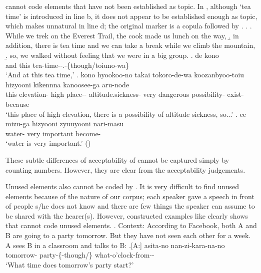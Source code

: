  cannot code elements that have not been established as topic.
In \Next,
although `tea time' is introduced in line b,
it does not appear to be established enough as topic,
which makes  unnatural in line d;
the original marker is a copula followed by .
%
\ex.\label{thii-taimu}
 \a. While we trek on the Everest Trail, the cook made us lunch on the way,
 \b. in addition, there is tea time and we can take a break while we climb the mountain,
 \b. so, we walked without feeling that we were in a big group.
 \bg. de kono  \\
		and this tea-time--.-\{though/toiuno-wa\} \\
		`And at this tea time,'
 \bg. kono hyookoo-no {takai} {tokoro-de-wa} koozanbyoo-toiu hizyooni {kikennna} {kanoosee-ga} aru-node \\
		this elevation- high place-- altitude.sickness- very dangerous possibility- exist-because \\
		`this place of high elevation, there is a possibility of altitude sickness, so...'
 \bg. ee {mizu-ga} hizyooni zyuuyooni nari-masu \\
		 water- very important become- \\
		`water is very important.'
		 \hfill{()}

These subtle differences of acceptability of  cannot be captured simply by counting numbers.
However, they are clear from the acceptability judgements.

Unused elements also cannot be coded by .
It is very difficult to find unused elements
because of the nature of our corpus;
each speaker gave a speech in front of people s/he does not know
and there are few things the speaker can assume to be shared with the hearer(s).
However, constructed examples like \Next clearly shows that  cannot code unused elements.
%
\ex. \label{FacebookParty}Context: According to Facebook, both A and B are going to a party tomorrow. But they have not seen each other for a week. A sees B in a classroom and talks to B:
	\a.[A:] asita-no  nan-zi-kara-na-no \\
		tomorrow- party-\{-though/\} what-o'clock-from-- \\
		`What time does tomorrow's party start?' 

